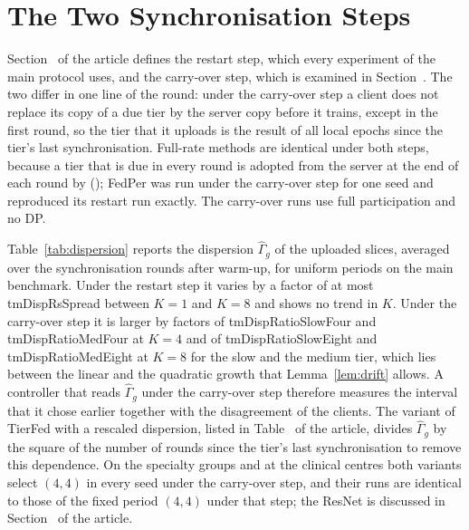 \documentclass[journal]{IEEEtran}
\newcommand{\tierfed}{TierFed}
\newcommand{\Gh}{\hat\Gamma}
\newcommand{\fit}[1]{\sbox\tabbox{#1}\ifdim\wd\tabbox>\linewidth\resizebox{\linewidth}{!}{\usebox\tabbox}\else\usebox\tabbox\fi}
\begin{document}
\begin{table}[t]
\caption{Intervals (slow, medium) selected by the privacy planner for each quota $\rho$ on the realised payload fraction and each prior weight $\lambda$; the selection is the same for $\varepsilon^\star\in\{1,2,4,8\}$}
\label{tab:planner}
\centering\small
\fit{\gen{tm_planner}}
\end{table}

\section{The Two Synchronisation Steps}
\label{supp:sync}
Section~ of the article defines the restart step, which every experiment of the main protocol uses, and the carry-over step, which is examined in Section~. The two differ in one line of the round: under the carry-over step a client does not replace its copy of a due tier by the server copy before it trains, except in the first round, so the tier that it uploads is the result of all local epochs since the tier's last synchronisation. Full-rate methods are identical under both steps, because a tier that is due in every round is adopted from the server at the end of each round by (); FedPer was run under the carry-over step for one seed and reproduced its restart run exactly. The carry-over runs use full participation and no DP.

Table~\ref{tab:dispersion} reports the dispersion $\Gh_g$ of the uploaded slices, averaged over the synchronisation rounds after warm-up, for uniform periods on the main benchmark. Under the restart step it varies by a factor of at most \num{tmDispRsSpread} between $K=1$ and $K=8$ and shows no trend in $K$. Under the carry-over step it is larger by factors of \num{tmDispRatioSlowFour} and \num{tmDispRatioMedFour} at $K=4$ and of \num{tmDispRatioSlowEight} and \num{tmDispRatioMedEight} at $K=8$ for the slow and the medium tier, which lies between the linear and the quadratic growth that Lemma~\ref{lem:drift} allows. A controller that reads $\Gh_g$ under the carry-over step therefore measures the interval that it chose earlier together with the disagreement of the clients. The variant of \tierfed{} with a rescaled dispersion, listed in Table~ of the article, divides $\Gh_g$ by the square of the number of rounds since the tier's last synchronisation to remove this dependence. On the specialty groups and at the clinical centres both variants select $(4,4)$ in every seed under the carry-over step, and their runs are identical to those of the fixed period $(4,4)$ under that step; the ResNet is discussed in Section~ of the article.
\end{document}
